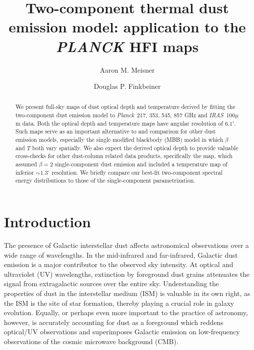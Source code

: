 \documentclass{emulateapj}
\newcommand{\IRAS}{{\it IRAS}}
\newcommand{\PLANCK}{{\it Planck}}
\begin{document}
\title{Two-component thermal dust emission model: application to the {\it PLANCK} HFI maps}
\author{Aaron M. Meisner}
\author{Douglas P. Finkbeiner}

\begin{abstract}
We present full-sky maps of dust optical depth and temperature derived by 
fitting the \cite{FDS99} two-component dust emission model to
\PLANCK~217, 353, 545, 857 GHz and \cite{SFD} \IRAS~100$\mu$m data. Both the 
optical depth and temperature maps have angular resolution of $6.1'$. Such maps
 serve as an important alternative to and comparison for other dust 
emission models, especially the single modified blackbody (MBB) model in which 
$\beta$ and $T$ both vary spatially. We also expect the derived optical 
depth to provide valuable cross-checks for other dust-column related data 
products, specifically the \cite{SFD} map, which assumed 
$\beta = 2$ single-component dust emission and included a temperature map of 
inferior $\sim$$1.3^{\circ}$ resolution. We briefly compare our 
best-fit two-component spectral energy distributions to those of the 
\cite{planckdust} single-component parametrization.
\end{abstract}

\section{Introduction}
The presence of Galactic interstellar dust affects
astronomical observations over a wide range of wavelengths. In the mid-infrared
and far-infrared, Galactic dust emission is a major contributor
to the observed sky intensity. At optical and ultraviolet (UV) wavelengths, 
extinction by foreground dust grains attenuates the signal from extragalactic 
sources over the entire sky. Understanding the properties of dust in the 
interstellar medium (ISM) is valuable in its own right, as the ISM is the site 
of star formation, thereby playing a crucial role in galaxy evolution. Equally,
 or perhaps even more important to the practice of astronomy, however, is 
accurately accounting for dust as a foreground which reddens optical/UV 
observations and superimposes Galactic emission on low-frequency observations 
of the cosmic microwave background (CMB). 
\end{document}
